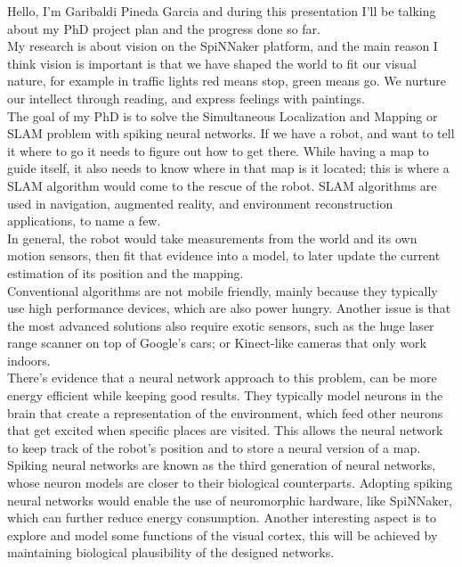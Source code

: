 \documentclass[12t,a4paper]{memoir}
\begin{document}
Hello, I'm Garibaldi Pineda Garcia and during this presentation I'll be 
talking about my PhD project plan and the progress done so far.\\

My research is about vision on the SpiNNaker platform, and the main reason I think vision is important is that we have shaped the world to fit our visual nature, for example in traffic lights red means stop, green means go. We nurture our intellect through reading, and express feelings with paintings.\\

The goal of my PhD is to solve the Simultaneous Localization and Mapping or SLAM problem with spiking neural networks. If we have a robot, and want to tell it where to go it needs to figure out how to get there. While having a map to guide itself, it also needs to know where in that map is it located; this is where a SLAM algorithm would come to the rescue of the robot. SLAM algorithms are used in navigation, augmented reality, and environment reconstruction applications, to name a few.\\

In general, the robot would take measurements from the world and its own motion sensors, then fit that evidence into a model, to later update the current estimation of its position and the mapping.\\

Conventional algorithms are not mobile friendly, mainly because they typically use high performance devices, which are also power hungry. Another issue is that the most advanced solutions also require exotic sensors, such as the huge laser range scanner on top of Google's cars; or Kinect-like cameras that only work indoors.\\

There's evidence that a neural network approach to this problem, can be more energy efficient while keeping good results. They typically model neurons in the brain that create a representation of the environment, which feed other neurons that get excited when specific places are visited. This allows the neural network to keep track of the robot's position and to store a neural version of a map.\\

Spiking neural networks are known as the third generation of neural networks, whose neuron models are closer to their biological counterparts. Adopting spiking neural networks would enable the use of neuromorphic hardware, like SpiNNaker, which can further reduce energy consumption. Another interesting aspect is to explore and model some functions of the visual cortex, this will be achieved by maintaining biological plausibility of the designed networks.\\
\end{document}
